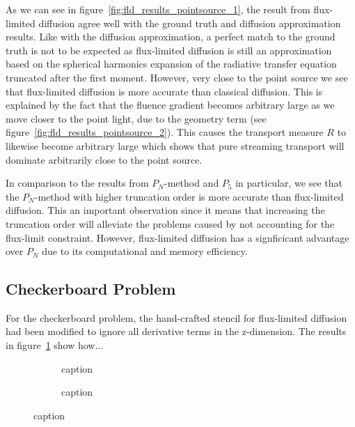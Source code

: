 
As we can see in figure~\ref{fig:fld_results_pointsource_1}, the result from flux-limited diffusion agree well with the ground truth and diffusion approximation results. Like with the diffusion approximation, a perfect match to the ground truth is not to be expected as flux-limited diffusion is still an approximation based on the spherical harmonics expansion of the radiative transfer equation truncated after the first moment. However, very close to the point source we see that flux-limited diffusion is more accurate than classical diffusion. This is explained by the fact that the fluence gradient becomes arbitrary large as we move closer to the point light, due to the geometry term (see figure~\ref{fig:fld_results_pointsource_2}). This causes the transport measure $R$ to likewise become arbitrary large which shows that pure streaming transport will dominate arbitrarily close to the point source.

In comparison to the results from $P_N$-method and $P_5$ in particular, we see that the $P_N$-method with higher truncation order is more accurate than flux-limited diffusion. This an important observation since it means that increasing the truncation order will alleviate the problems caused by not accounting for the flux-limit constraint. However, flux-limited diffusion has a signficicant advantage over $P_N$ due to its computational and memory efficiency.

\subsection{Checkerboard Problem}
\label{sec:pn_results_checkerboard}

For the checkerboard problem, the hand-crafted stencil for flux-limited diffusion had been modified to ignore all derivative terms in the z-dimension. The results in figure~\ref{fig:fld_results_checkerboard_1} show how...
\begin{figure}[h]
\centering
\begin{subfigure}{0.49\columnwidth}
\caption{caption}
\label{fig:fld_results_checkerboard_1}
\end{subfigure}%
\hspace{0.01\columnwidth}
\begin{subfigure}{0.49\columnwidth}
\caption{caption}
\label{fig:fld_results_checkerboard_2}
\end{subfigure}%
\caption{caption}
\label{fig:fld_results_checkerboard}
\end{figure}

